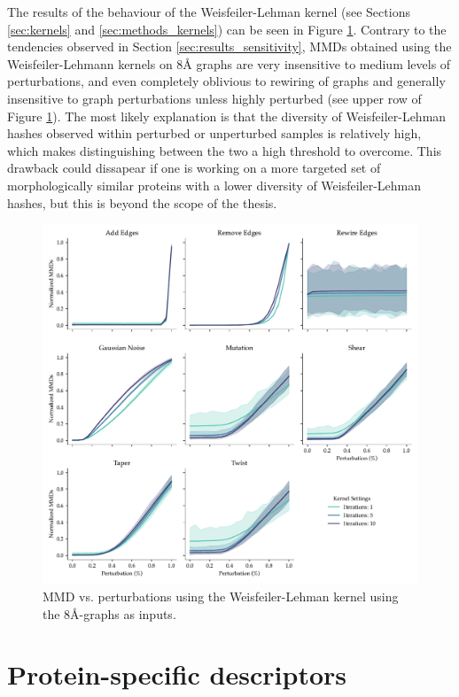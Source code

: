 The results of the behaviour of the Weisfeiler-Lehman kernel (see Sections
\ref{sec:kernels} and \ref{sec:methods_kernels}) can be seen in Figure
\ref{fig:wlk}. Contrary to the tendencies observed in Section
\ref{sec:results_sensitivity}, MMDs obtained using the Weisfeiler-Lehmann
kernels on 8\si{\angstrom} graphs are very insensitive to medium levels of perturbations,
and even completely oblivious to rewiring of graphs and generally insensitive to
graph perturbations unless highly perturbed (see upper row of Figure \ref{fig:wlk}). The most likely explanation
is that the diversity of Weisfeiler-Lehman hashes observed within perturbed or
unperturbed samples is relatively high, which makes distinguishing between the
two a high threshold to overcome. This drawback could dissapear if one is working on
a more targeted set of morphologically similar proteins with a lower diversity
of Weisfeiler-Lehman hashes, but this is beyond the scope of the thesis.

\begin{figure}
  \includegraphics[width=\textwidth]{./figures/results/res_3.pdf}
  \caption[MMD vs. perturbations using the Weisfeiler-Lehman kernel.]{MMD vs.
    perturbations using the Weisfeiler-Lehman kernel using the
    8\si{\angstrom}-graphs as inputs.}
  \label{fig:wlk}
\end{figure}

\section{Protein-specific descriptors}\label{sec:results_protein_descriptors}

